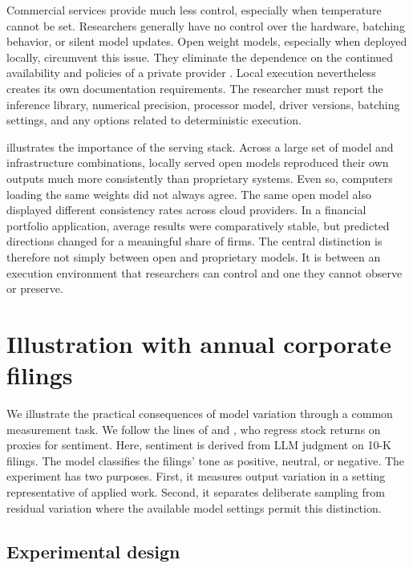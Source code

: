 \documentclass[11pt]{article}
\newcommand{\florian}[1]{\textcolor{apidark}{florian: #1}}
\begin{document}
Commercial services provide much less control, especially when temperature cannot be set. Researchers generally have no control over the hardware, batching behavior, or silent model updates. Open weight models, especially when deployed locally, circumvent this issue. They eliminate the dependence on the continued availability and policies of a private provider \citep{spirling2023}. Local execution nevertheless creates its own documentation requirements. The researcher must report the inference library, numerical precision, processor model, driver versions, batching settings, and any options related to deterministic execution.\medskip

\citet{yang2026} illustrates the importance of the serving stack. Across a large set of model and infrastructure combinations, locally served open models reproduced their own outputs much more consistently than proprietary systems. Even so, computers loading the same weights did not always agree. The same open model also displayed different consistency rates across cloud providers. In a financial portfolio application, average results were comparatively stable, but predicted directions changed for a meaningful share of firms. The central distinction is therefore not simply between open and proprietary models. It is between an execution environment that researchers can control and one they cannot observe or preserve.%

\section{Illustration with annual corporate filings}\label{sec:illustration}

We illustrate the practical consequences of model variation through a common measurement task. We follow the lines of \cite{tetlock2008more} and \cite{loughran2011liability}, who regress stock returns on proxies for sentiment. Here, sentiment is derived from LLM judgment on 10-K filings. The model classifies the filings' tone as positive, neutral, or negative. The experiment has two purposes. First, it measures output variation in a setting representative of applied work. Second, it separates deliberate sampling from residual variation where the available model settings permit this distinction.

\subsection{Experimental design}
\end{document}
